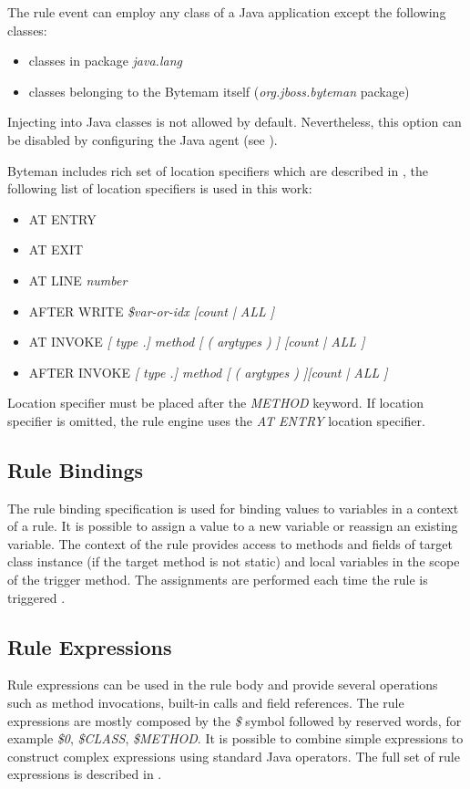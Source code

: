 \documentclass[12pt,oneside]{fithesis2}
\begin{document}
The rule event can employ any class of a Java application except the following classes:

\begin{itemize}
   \item classes in package \textit{java.lang}
   \item classes belonging to the Bytemam itself (\textit{org.jboss.byteman} package)
\end{itemize}

Injecting into Java classes is not allowed by default. Nevertheless, this option can be disabled by configuring the Java agent (see \cite[Available -javaagent Options]{byteman_doc}).

Byteman includes rich set of location specifiers which are described in \cite[Location Specifiers]{byteman_doc}, the following list of location specifiers is used in this work:

\begin{itemize}
\item	AT ENTRY
\item	AT EXIT
\item	AT LINE \textit{number}
\item	AFTER WRITE \textit{\$var-or-idx [count | ALL ]}
\item	AT INVOKE \textit{[ type .] method [ ( argtypes ) ] [count | ALL ]}
\item	AFTER INVOKE \textit{[ type .] method [ ( argtypes ) ][count | ALL ]}
\end{itemize}

Location specifier must be placed after the \textit{METHOD} keyword. If location specifier is omitted, the rule engine uses the \textit{AT ENTRY} location specifier.

\subsection{Rule Bindings}
\label{subsec:rule_bindings}
The rule binding specification is used for binding values to variables in a context of a rule. It is possible to assign a value to a new variable or reassign an existing variable. The context of the rule provides access to methods and fields of target class instance (if the target method is not static) and local variables in the scope of the trigger method. The assignments are performed each time the rule is triggered \cite[Rule Bindings]{byteman_doc}.

\subsection{Rule Expressions}
\label{rule_exp}
Rule expressions can be used in the rule body and provide several operations such as method invocations, built-in calls and field references. The rule expressions are mostly composed by the \textit{\$} symbol followed by reserved words, for example \textit{\$0}, \textit{\$CLASS}, \textit{\$METHOD}. It is possible to combine simple expressions to construct complex expressions using standard Java operators. The full set of rule expressions is described in \cite[Rule Expressions]{byteman_doc}.
\end{document}

